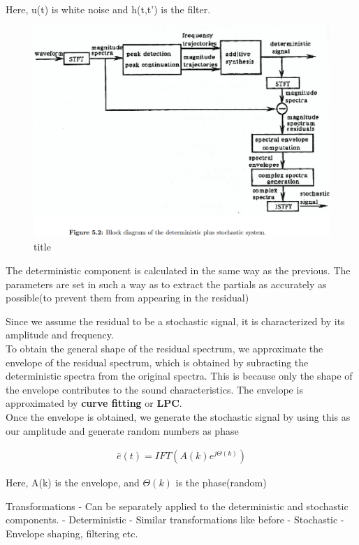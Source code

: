 \documentclass[11pt]{article}
\makeatletter
\def\maxwidth{\ifdim\Gin@nat@width>\linewidth\linewidth
    \else\Gin@nat@width\fi}
\let\Oldincludegraphics\includegraphics
\renewcommand{\includegraphics}[1]{\Oldincludegraphics[width=.8\maxwidth]{#1}}
\makeatother
\begin{document}
Here, u(t) is white noise and h(t,t') is the filter.

    \begin{figure}
\centering
\includegraphics{fig_7.png}
\caption{title}
\end{figure}

    The deterministic component is calculated in the same way as the
previous. The parameters are set in such a way as to extract the
partials as accurately as possible(to prevent them from appearing in the
residual)

    Since we assume the residual to be a stochastic signal, it is
characterized by its amplitude and frequency.\\
To obtain the general shape of the residual spectrum, we approximate the
envelope of the residual spectrum, which is obtained by subracting the
deterministic spectra from the original spectra. This is because only
the shape of the envelope contributes to the sound characteristics. The
envelope is approximated by \textbf{curve fitting} or \textbf{LPC}.\\
Once the envelope is obtained, we generate the stochastic signal by
using this as our amplitude and generate random numbers as phase

\begin{align}
\hat e(t) = IFT(A(k)e^{j \Theta(k)})
\end{align}

Here, A(k) is the envelope, and \(\Theta(k)\) is the phase(random)

    Transformations - Can be separately applied to the deterministic and
stochastic components. - Deterministic - Similar transformations like
before - Stochastic - Envelope shaping, filtering etc.
\end{document}

